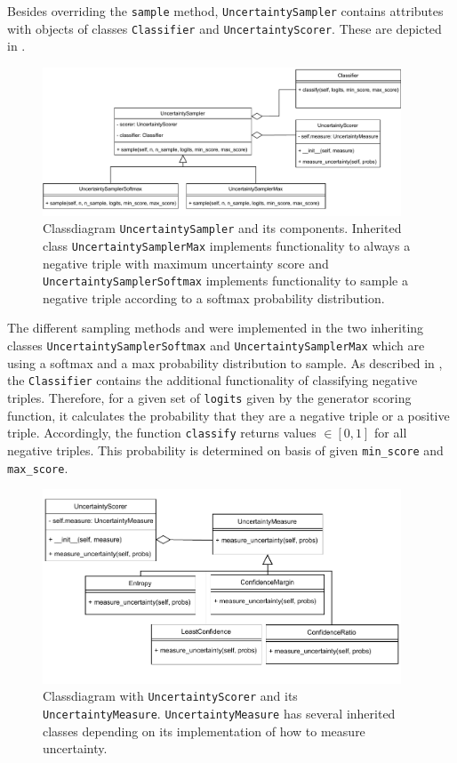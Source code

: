 Besides overriding the \texttt{sample} method, \texttt{UncertaintySampler} contains attributes with objects of classes \texttt{Classifier} and \texttt{UncertaintyScorer}.
These are depicted in .
\begin{figure}[t]
  \centering
    \includegraphics[width=0.95\textwidth]{figures/classdiagrams/UncertaintySampler.pdf}
    \caption{Classdiagram \texttt{UncertaintySampler} and its components.
    Inherited class \texttt{UncertaintySamplerMax} implements functionality to always a negative triple with maximum uncertainty score and \texttt{UncertaintySamplerSoftmax} implements functionality to sample a negative triple according to a softmax probability distribution.}
  \label{fig:uncertainty_sampler}
\end{figure}
The different sampling methods \usmax and \ussoftmax were implemented in the two inheriting classes \texttt{UncertaintySamplerSoftmax} and \texttt{UncertaintySamplerMax} which are using a softmax and a max probability distribution to sample.
As described in , the \texttt{Classifier} contains the additional functionality of classifying negative triples.
Therefore, for a given set of \texttt{logits} given by the generator scoring function, it calculates the probability that they are a negative triple or a positive triple.
Accordingly, the function \texttt{classify} returns values $\in [0,1]$ for all negative triples.
This probability is determined on basis of given \texttt{min\_score} and \texttt{max\_score}.
\begin{figure}[H]
  \centering
    \includegraphics[width=0.95\textwidth]{figures/classdiagrams/UncertaintyScorer.pdf}
  \caption{Classdiagram with \texttt{UncertaintyScorer} and its \texttt{UncertaintyMeasure}.
  \texttt{UncertaintyMeasure} has several inherited classes depending on its implementation of how to measure uncertainty.}
  \label{fig:uncertainty_measures}
\end{figure}
